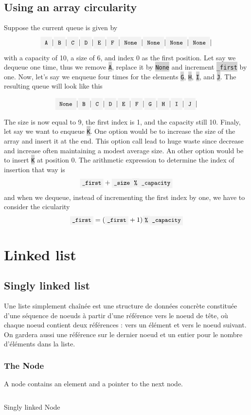 \documentclass[10pt]{article}
\newcommand{\code}[1]{{\small\colorbox{LightGray}{\texttt{#1}}}}
\newcommand{\boxx}[1]{{\LARGE\colorbox{LightGray}{\code{#1}}|}}
\begin{document}
\subsection{Using an array circularity}

Suppose the current queue is given by
\[
	\boxx{A}\boxx{B}\boxx{C}\boxx{D}\boxx{E}\boxx{F}\boxx{None}\boxx{None}\boxx{None}\boxx{None}
\]
with a capacity of 10, a size of 6, and index 0 as the first position. Let say we dequeue one time, thus we remove \code{A}, replace it by \code{None} and increment \code{\_first} by one. Now, let's say we enqueue four times for the elements \code{G}, \code{H}, \code{I}, and \code{J}. The resulting queue will look like this

\[
	\boxx{None}\boxx{B}\boxx{C}\boxx{D}\boxx{E}\boxx{F}\boxx{G}\boxx{H}\boxx{I}\boxx{J}
\]

The size is now equal to 9, the first index is 1, and the capacity still 10. Finaly, let say we want to enqueue \code{K}. One option would be to increase the size of the array and insert it at the end. This option call lead to huge waste since decrease and increase often maintaining a modest average size. An other option would be to insert \code{K} at position 0. The arithmetic expression to determine the index of insertion that way is
\[
	\code{\_first} + \code{\_size} \code{\%} \code{\_capacity}
\]
and when we dequeue, instead of incrementing the first index by one, we have to consider the cicularity
\[
\code{\_first} = (\code{\_first} + 1) \code{\%} \code{\_capacity}
\]

\section{Linked list}
\subsection{Singly linked list}
Une liste simplement chaînée est une structure de données concrète constituée
d'une séquence de noeuds à partir d'une référence vers le noeud de tête, où
chaque noeud contient deux références : vers un élément et vers le noeud suivant. On gardera aussi une référence sur le dernier noeud et un entier pour le nombre d'éléments dans la liste.\\

\subsubsection{The Node}
A node contains an element and a pointer to the next node.
\begin{listing}[ht]
	\inputminted[bgcolor=LightGray]{python}{node.py}
	\caption{Singly linked Node}
	\label{listing:singlyLinkedNode}
\end{listing}
\end{document}
